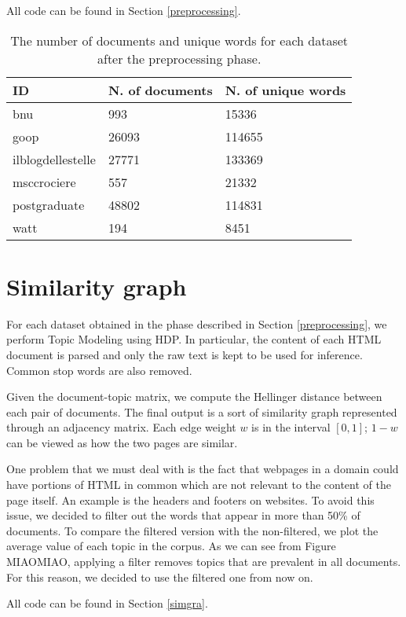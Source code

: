 All code can be found in Section \ref{preprocessing}.

\begin{table}[H]
    \begin{center}
        \begin{tabular}{ |l|l|l| }
            \hline
            ID                & N. of documents & N. of unique words \\
            \hline
            bnu               & 993             & 15336              \\
            \hline
            goop              & 26093           & 114655             \\
            \hline
            ilblogdellestelle & 27771           & 133369             \\
            \hline
            msccrociere       & 557             & 21332              \\
            \hline
            postgraduate      & 48802           & 114831             \\
            \hline
            watt              & 194             & 8451               \\
            \hline
        \end{tabular}
    \end{center}
    \caption{
        The number of documents and unique words for each dataset after the preprocessing phase.
    }
    \label{table:dbprocdata}
\end{table}

\section{Similarity graph}
For each dataset obtained in the phase described in Section \ref{preprocessing},
we perform Topic Modeling using HDP. In particular, the content of each HTML document is
parsed and only the raw text is kept to be used for inference. Common stop words are also removed.

Given the document-topic matrix,
we compute the Hellinger distance between each pair of documents.
The final output is a sort of similarity graph represented through an adjacency matrix.
Each edge weight $w$ is in the interval $[0, 1]$;
$1-w$ can be viewed as how the two pages are similar.

One problem that we must deal with is the fact that
webpages in a domain could have portions of HTML in common which are not relevant to the content of the page itself.
An example is the headers and footers on websites.
To avoid this issue, we decided to filter out the words that appear in more than 50\% of documents.
To compare the filtered version with the non-filtered, we plot the average value of each topic in the corpus.
As we can see from Figure MIAOMIAO, applying a filter removes topics that are prevalent in all documents.
For this reason, we decided to use the filtered one from now on.

All code can be found in Section \ref{simgra}.